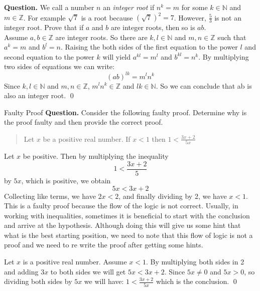 \begin{example}{}
	\textbf{Question.} We call a number $ n $ an \emph{integer root} if $ n^k=m $ for some $ k \in \mathbb{N} $ and $ m \in \mathbb{Z} $. For example $ \sqrt{7} $ is a root because $ (\sqrt{7})^2 = 7 $. However, $ \frac{5}{3} $ is not an integer root. Prove that if $ a $ and $ b $ are integer roots, then so is $ ab $. \\
	
	 Assume $ a,b \in \mathbb{Z} $ are integer roots. So there are $ k,l \in \mathbb{N} $ and $ m,n \in \mathbb{Z} $ such that $ a^k = m $ and $ b^l=n $. Raising the both sides of the first equation to the power $ l $ and second equation to the power $ k $ will yield $ a^{kl} = m^l $ and $ b^{kl} = n^k $. By multiplying two sides of equations we can write:
	\[ (ab)^{lk} = m^l n^k \] 
	Since $ k,l \in \mathbb{N} $ and $ m,n \in \mathbb{Z} $, $ m^l n^k \in \mathbb{Z} $ and $ lk \in \mathbb{N} $. So we can conclude that ab is also an integer root. \qed
\end{example}

\begin{example}{Faulty Proof}
	\textbf{Question.} Consider the following faulty proof. Determine why is the proof faulty and then provide the correct proof.
	\begin{quote}
		\centering
		Let $ x $ be a positive real number. If $ x<1 $ then $ 1 < \frac{3x+2}{5x} $
	\end{quote}
	
	 Let $ x $ be positive. Then by multiplying the inequality 
	\[ 1 < \frac{3x+2}{5} \]
	by $ 5x $, which is positive, we obtain
	\[ 5x < 3x + 2 \]
	Collecting like terms, we have $ 2x < 2 $, and finally dividing by 2, we have $ x < 1 $. \\
	
	 This is a faulty proof because the flow of the logic is not correct. Usually, in working with inequalities, sometimes it is beneficial to start with the conclusion and arrive at the hypothesis. Although doing this will give us some hint that what is the best starting position, we need to note that this flow of logic is not a proof and we need to re write the proof after getting some hints.
	
	 Let $ x $ is a positive real number. Assume $ x < 1 $. By multiplying both sides in 2 and adding $ 3x $ to both sides we will get $ 5x < 3x+2 $. Since $ 5x \neq 0 $ and $ 5x > 0 $, so dividing both sides by $ 5x $ we will have: $ 1 < \frac{3x+2}{5x} $ which is the conclusion. \qed
\end{example}




